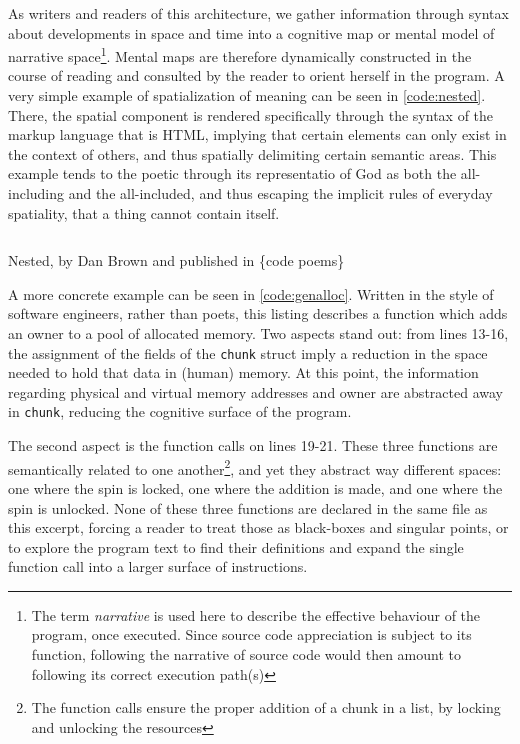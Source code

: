 As writers and readers of this architecture, we gather information through syntax about developments in space and time into a cognitive map or mental model of narrative space\footnote{The term \emph{narrative} is used here to describe the effective behaviour of the program, once executed. Since source code appreciation is subject to its function, following the narrative of source code would then amount to following its correct execution path(s)}. Mental maps are therefore dynamically constructed in the course of reading and consulted by the reader to orient herself in the program. A very simple example of spatialization of meaning can be seen in \ref{code:nested}. There, the spatial component is rendered specifically through the syntax of the markup language that is HTML, implying that certain elements can only exist in the context of others, and thus spatially delimiting certain semantic areas. This example tends to the poetic through its representatio of God as both the all-including and the all-included, and thus escaping the implicit rules of everyday spatiality, that a thing cannot contain itself.

\begin{listing}
    \inputminted[]{html}{./corpus/nested.html}
    \caption{Nested, by Dan Brown and published in \{code poems\} \citep{bertram_code_2012}}
    \label{code:nested}
\end{listing}

A more concrete example can be seen in \ref{code:genalloc}. Written in the style of software engineers, rather than poets, this listing describes a function which adds an owner to a pool of allocated memory. Two aspects stand out: from lines 13-16, the assignment of the fields of the \lstinline{chunk} struct imply a reduction in the space needed to hold that data in (human) memory. At this point, the information regarding physical and virtual memory addresses and owner are abstracted away in  \lstinline{chunk}, reducing the cognitive surface of the program.

The second aspect is the function calls on lines 19-21. These three functions are semantically related to one another\footnote{The function calls ensure the proper addition of a chunk in a list, by locking and unlocking the resources}, and yet they abstract way different spaces: one where the spin is locked, one where the addition is made, and one where the spin is unlocked. None of these three functions are declared in the same file as this excerpt, forcing a reader to treat those as black-boxes and singular points, or to explore the program text to find their definitions and expand the single function call into a larger surface of instructions.

